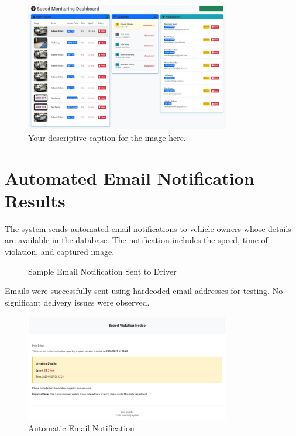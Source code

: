\begin{figure}[h!]
    \centering
    \includegraphics[width=0.8\textwidth]{figures/photo_2025-05-27_01-32-50.jpg}
    \caption{Your descriptive caption for the image here.}
    \label{fig:dashboard} %
\end{figure}

\section{Automated Email Notification Results}
The system sends automated email notifications to vehicle owners whose details are available in the database. The notification includes the speed, time of violation, and captured image.

\begin{figure}[H]
    \centering
    \caption{Sample Email Notification Sent to Driver}
\end{figure}

Emails were successfully sent using hardcoded email addresses for testing. No significant delivery issues were observed.

\begin{figure}[h!]
    \centering
    \includegraphics[width=0.8\textwidth]{figures/photo_2025-05-27_01-35-23.jpg}
    \caption{Automatic Email Notification}
    \label{fig:auto-email} %
\end{figure}

